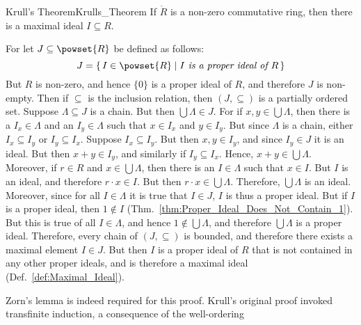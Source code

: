 \documentclass{article}                                                        %
\begin{document}
        \begin{ftheorem}{Krull's Theorem}{Krulls_Theorem}
            If $\ring{R}$ is a non-zero commutative ring, then there is a
            maximal ideal $I\subseteq{R}$.
        \end{ftheorem}
        \begin{bproof}
            For let $J\subseteq\powset{R}$ be defined as follows:
            \begin{equation}
                J=\{\,I\in\powset{R}\;|\;I\textit{ is a proper ideal of }R\,\}
            \end{equation}
            But $R$ is non-zero, and hence $\{0\}$ is a proper ideal of $R$,
            and therefore $J$ is non-empty. Then if $\subseteq$ is the inclusion
            relation, then $(J,\subseteq)$ is a partially ordered set. Suppose
            $\Lambda\subseteq{J}$ is a chain. But then $\bigcup\Lambda\in{J}$.
            For if $x,y\in\bigcup\Lambda$, then there is a $I_{x}\in\Lambda$ and
            an $I_{y}\in\Lambda$ such that $x\in{I}_{x}$ and $y\in{I}_{y}$. But
            since $\Lambda$ is a chain, either $I_{x}\subseteq{I}_{y}$ or
            $I_{y}\subseteq{I}_{x}$. Suppose $I_{x}\subseteq{I}_{y}$. But then
            $x,y\in{I}_{y}$, and since $I_{y}\in{J}$ it is an ideal. But then
            $x+y\in{I}_{y}$, and similarly if $I_{y}\subseteq{I}_{x}$. Hence,
            $x+y\in\bigcup\Lambda$. Moreover, if $r\in{R}$ and
            $x\in\bigcup\Lambda$, then there is an $I\in\Lambda$ such that
            $x\in{I}$. But $I$ is an ideal, and therefore $r\cdot{x}\in{I}$.
            But then $r\cdot{x}\in\bigcup\Lambda$. Therefore, $\bigcup\Lambda$
            is an ideal. Moreover, since for all $I\in\Lambda$ it is true that
            $I\in{J}$, $I$ is thus a proper ideal. But if $I$ is a proper ideal,
            then $1\not\in{I}$ (Thm.~\ref{thm:Proper_Ideal_Does_Not_Contain_1}).
            But this is true of all $I\in\Lambda$, and hence
            $1\notin\bigcup\Lambda$, and therefore $\bigcup\Lambda$ is a proper
            ideal. Therefore, every chain of $(J,\subseteq)$ is bounded, and
            therefore there exists a maximal element $I\in{J}$. But then $I$
            is a proper ideal of $R$ that is not contained in any other proper
            ideals, and is therefore a maximal ideal
            (Def.~\ref{def:Maximal_Ideal}).
        \end{bproof}
        Zorn's lemma is indeed required for this proof. Krull's original proof
        invoked transfinite induction, a consequence of the well-ordering
\end{document}
